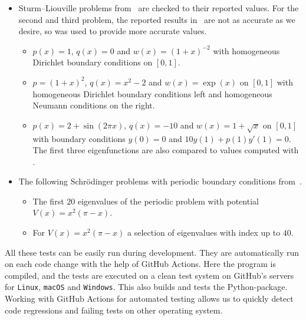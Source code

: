 \begin{itemize}
\begin{itemize}
          \end{itemize}
    \item Sturm--Liouville problems from~\cite{siedlecki_sturmliouville_2016} are checked to their reported values. For the second and third problem, the reported results in~\cite{siedlecki_sturmliouville_2016} are not as accurate as we desire, so  was used to provide more accurate values.
          \begin{itemize}
              \item $p(x)=1$, $q(x)=0$ and $w(x)=(1+x)^{-2}$ with homogeneous Dirichlet boundary conditions on $[0, 1]$.
              \item $p=(1+x)^2$, $q(x) = x^2-2$ and $w(x) = \exp(x)$ on $[0, 1]$ with homogeneous Dirichlet boundary conditions left and homogeneous Neumann conditions on the right.
              \item $p(x) = 2+\sin(2 \pi x)$, $q(x) = -10$ and $w(x) = 1+\sqrt{x}$ on $[0, 1]$ with boundary conditions $y(0) = 0$ and $10 y(1) + p(1) y'(1) = 0$. The first three eigenfunctions are also compared to values computed with .
          \end{itemize}
    \item The following Schrödinger problems with periodic boundary conditions from~\cite{andrew_correction_1989}.
          \begin{itemize}
              \item The first $20$ eigenvalues of the periodic problem with potential $V(x) = x^2(\pi - x)$.
              \item For $V(x) = x^2(\pi - x)$ a selection of eigenvalues with index up to $40$.
          \end{itemize}
\end{itemize}

All these tests can be easily run during development. They are automatically run on each code change with the help of GitHub Actions. Here the program is compiled, and the tests are executed on a clean test system on GitHub's servers for \texttt{Linux}, \texttt{macOS} and \texttt{Windows}. This also builds and tests the Python-package. Working with GitHub Actions for automated testing allows us to quickly detect code regressions and failing tests on other operating system.


